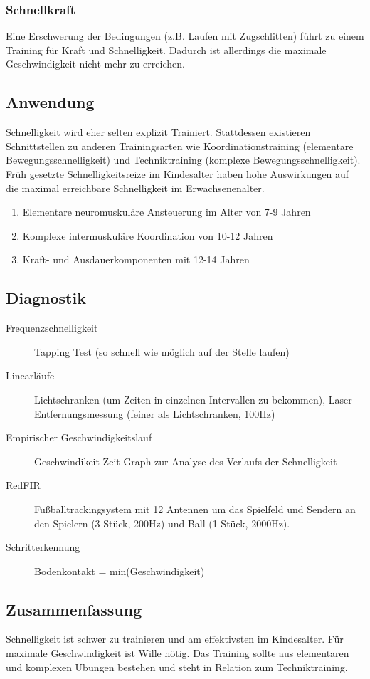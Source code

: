 \subsubsection{Schnellkraft}
Eine Erschwerung der Bedingungen (z.B. Laufen mit Zugschlitten) führt zu einem Training für Kraft und Schnelligkeit.
Dadurch ist allerdings die maximale Geschwindigkeit nicht mehr zu erreichen.

\subsection{Anwendung}
Schnelligkeit wird eher selten explizit Trainiert.
Stattdessen existieren Schnittstellen zu anderen Trainingsarten wie Koordinationstraining (elementare Bewegungsschnelligkeit) und Techniktraining (komplexe Bewegungsschnelligkeit).\\
Früh gesetzte Schnelligkeitsreize im Kindesalter haben hohe Auswirkungen auf die maximal erreichbare Schnelligkeit im Erwachsenenalter.
\begin{enumerate}
    \item Elementare neuromuskuläre Ansteuerung im Alter von 7-9 Jahren
    \item Komplexe intermuskuläre Koordination von 10-12 Jahren
    \item Kraft- und Ausdauerkomponenten mit 12-14 Jahren
\end{enumerate}

\subsection{Diagnostik}
\begin{description}
    \item[Frequenzschnelligkeit] Tapping Test (so schnell wie möglich auf der Stelle laufen)
    \item[Linearläufe] Lichtschranken (um Zeiten in einzelnen Intervallen zu bekommen), Laser-Entfernungsmessung (feiner als Lichtschranken, 100Hz)
    \item[Empirischer Geschwindigkeitslauf] Geschwindikeit-Zeit-Graph zur Analyse des Verlaufs der Schnelligkeit
    \item[RedFIR] Fußballtrackingsystem mit 12 Antennen um das Spielfeld und Sendern an den Spielern (3 Stück, 200Hz) und Ball (1 Stück, 2000Hz).
    \item[Schritterkennung] Bodenkontakt = min(Geschwindigkeit)
\end{description}

\subsection{Zusammenfassung}
Schnelligkeit ist schwer zu trainieren und am effektivsten im Kindesalter.
Für maximale Geschwindigkeit ist Wille nötig.
Das Training sollte aus elementaren und komplexen Übungen bestehen und steht in Relation zum Techniktraining.
